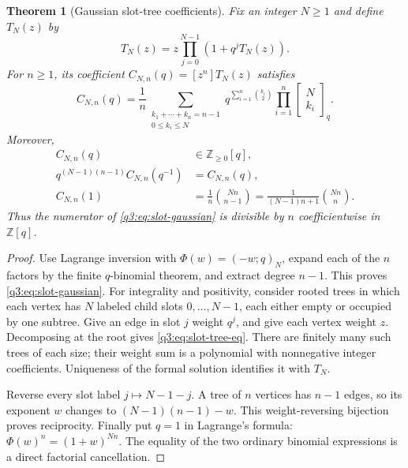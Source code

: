 \documentclass[11pt,a4paper,oneside,openany]{book}
\newtheorem{theorem}{Theorem}[chapter]
\theoremstyle{definition}
\theoremstyle{remark}
\newcommand{\Z}{\mathbb Z}
\newcommand{\GB}[3][q]{\begin{bmatrix}#2\\#3\end{bmatrix}_{#1}}
\newcommand{\coef}[2]{[#1^{#2}]}
\newcommand{\G}[2]{\GB{#1}{#2}}
\begin{document}
\begin{theorem}[Gaussian slot-tree coefficients]\label{q3:thm:slot-tree}
Fix an integer $N\ge1$ and define $T_N(z)$ by
\begin{equation}
 T_N(z)=z\prod_{j=0}^{N-1}(1+q^jT_N(z)).
 \label{q3:eq:slot-tree-eq}
\end{equation}
For $n\ge1$, its coefficient $C_{N,n}(q)=\coef zn T_N(z)$ satisfies
\begin{equation}
 C_{N,n}(q)=\frac1n
   \sum_{\substack{k_1+\cdots+k_n=n-1\\0\le k_i\le N}}
        q^{\sum_{i=1}^n\binom{k_i}2}
        \prod_{i=1}^n\G N{k_i}.
 \label{q3:eq:slot-gaussian}
\end{equation}
Moreover,
\begin{align}
 C_{N,n}(q)&\in\Z_{\ge0}[q],
 \label{q3:eq:slot-positive}\\
 q^{(N-1)(n-1)}C_{N,n}(q^{-1})&=C_{N,n}(q),
 \label{q3:eq:slot-reciprocal}\\
 C_{N,n}(1)&=\frac1n\binom{Nn}{n-1}
 =\frac1{(N-1)n+1}\binom{Nn}{n}.
 \label{q3:eq:slot-fuss}
\end{align}
Thus the numerator of \cref{q3:eq:slot-gaussian} is divisible by $n$
coefficientwise in $\Z[q]$.
\end{theorem}
\begin{proof}
Use Lagrange inversion with $\Phi(w)=(-w;q)_N$, expand each of the $n$
factors by the finite $q$-binomial theorem, and extract degree $n-1$.
This proves \cref{q3:eq:slot-gaussian}.
For integrality and positivity, consider rooted trees in which each
vertex has $N$ labeled child slots $0,\ldots,N-1$, each either empty or
occupied by one subtree. Give an edge in slot $j$ weight $q^j$, and give
each vertex weight $z$. Decomposing at the root gives
\cref{q3:eq:slot-tree-eq}. There are finitely many such trees of each size;
their weight sum is a polynomial with nonnegative integer coefficients.
Uniqueness of the formal solution identifies it with $T_N$.

Reverse every slot label $j\mapsto N-1-j$. A tree of $n$ vertices has
$n-1$ edges, so its exponent $w$ changes to $(N-1)(n-1)-w$. This
weight-reversing bijection proves reciprocity. Finally put $q=1$ in
Lagrange's formula: $\Phi(w)^n=(1+w)^{Nn}$. The equality of the two
ordinary binomial expressions is a direct factorial cancellation.
\end{proof}
\end{document}
